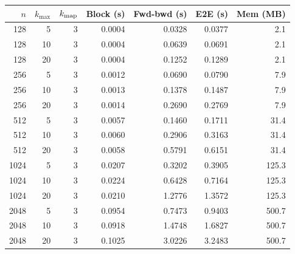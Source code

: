 \begin{tabular}{rrrrrrr}
\toprule
$n$ & $k_{\max}$ & $k_{\rm map}$ & Block (s) & Fwd-bwd (s) & E2E (s) & Mem (MB)\\
\midrule
128 & 5 & 3 & 0.0004 & 0.0328 & 0.0377 & 2.1\\
128 & 10 & 3 & 0.0004 & 0.0639 & 0.0691 & 2.1\\
128 & 20 & 3 & 0.0004 & 0.1252 & 0.1289 & 2.1\\
256 & 5 & 3 & 0.0012 & 0.0690 & 0.0790 & 7.9\\
256 & 10 & 3 & 0.0013 & 0.1378 & 0.1487 & 7.9\\
256 & 20 & 3 & 0.0014 & 0.2690 & 0.2769 & 7.9\\
512 & 5 & 3 & 0.0057 & 0.1460 & 0.1711 & 31.4\\
512 & 10 & 3 & 0.0060 & 0.2906 & 0.3163 & 31.4\\
512 & 20 & 3 & 0.0058 & 0.5791 & 0.6151 & 31.4\\
1024 & 5 & 3 & 0.0207 & 0.3202 & 0.3905 & 125.3\\
1024 & 10 & 3 & 0.0224 & 0.6428 & 0.7164 & 125.3\\
1024 & 20 & 3 & 0.0210 & 1.2776 & 1.3572 & 125.3\\
2048 & 5 & 3 & 0.0954 & 0.7473 & 0.9403 & 500.7\\
2048 & 10 & 3 & 0.0918 & 1.4748 & 1.6827 & 500.7\\
2048 & 20 & 3 & 0.1025 & 3.0226 & 3.2483 & 500.7\\
\bottomrule
\end{tabular}
